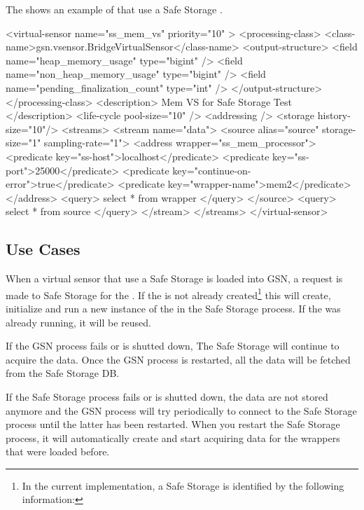 The  shows an example of \vsd that use a Safe Storage \wrapper.

\begin{xmlcode}[caption={Sample of Email Notification VSD file}, label=listing:xml:safestorage_vsd]
<virtual-sensor name="ss_mem_vs" priority="10" >
	<processing-class>
		<class-name>gsn.vsensor.BridgeVirtualSensor</class-name>
		<output-structure>
			<field name="heap_memory_usage" type="bigint" />
			<field name="non_heap_memory_usage" type="bigint" />
			<field name="pending_finalization_count" type="int" />
		</output-structure>
	</processing-class>
	<description> Mem VS for Safe Storage Test </description>
	<life-cycle pool-size="10" />
	<addressing />
	<storage history-size="10"/>
	<streams>
		<stream name="data">
			<source alias="source" storage-size="1" sampling-rate="1">
				<address wrapper="ss_mem_processor">
					<predicate key="ss-host">localhost</predicate>
					<predicate key="ss-port">25000</predicate>
					<predicate key="continue-on-error">true</predicate>
					<predicate key="wrapper-name">mem2</predicate>
				</address>
				<query> select * from wrapper </query>
			</source>
			<query> select * from source </query>
		</stream>
	</streams>
</virtual-sensor>
\end{xmlcode}

\subsection{Use Cases}

When a virtual sensor that use a Safe Storage \wrapper is loaded into GSN,
a request is made to Safe Storage for the \wrapper. If the \wrapper is not already
created\footnote{In the current implementation, a Safe Storage \wrapper is identified by the following information:\newline{}
} 
this will create, initialize and run a new instance of the \wrapper in the Safe Storage process.
If the \wrapper was already running, it will be reused.

If the GSN process fails or is shutted down, The Safe Storage \wrapper will continue to acquire the data. Once the GSN process is
restarted, all the data will be fetched from the Safe Storage DB.

If the Safe Storage process fails or is shutted down, the data are not stored anymore and the GSN process will try periodically to 
connect to the Safe Storage process until the latter has been restarted.
When you restart the Safe Storage process, it will automatically create and start acquiring data for the wrappers that were loaded before.

